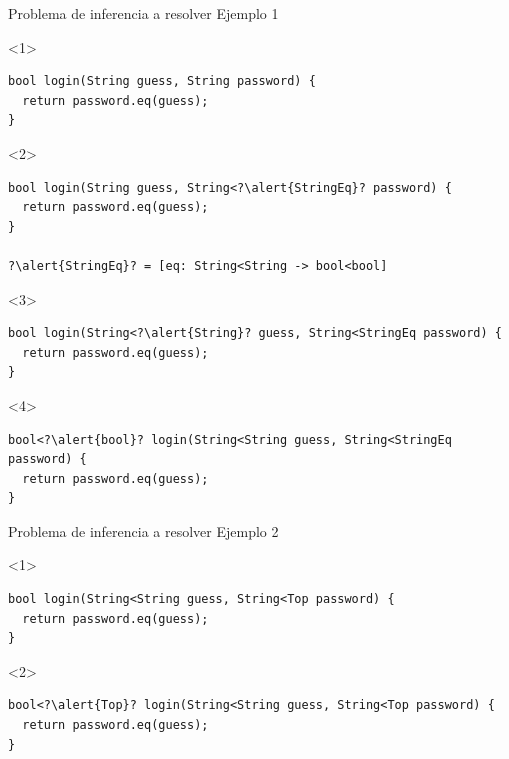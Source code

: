 \documentclass[aspectratio=169,10pt]{beamer}
\begin{document}
\begin{frame}[fragile]{Problema de inferencia a resolver}
	Ejemplo 1 \\
	\vspace{1cm}
	\begin{onlyenv}
\begin{lstlisting}[escapechar=?,basicstyle=\fontsize{9}{9}\ttfamily]
bool login(String guess, String password) {
  return password.eq(guess);
}
\end{lstlisting}
	\end{onlyenv}
	\begin{onlyenv}
\begin{lstlisting}[escapechar=?,basicstyle=\fontsize{9}{9}\ttfamily]
bool login(String guess, String<?\alert{StringEq}? password) {
  return password.eq(guess);
}

?\alert{StringEq}? = [eq: String<String -> bool<bool]
\end{lstlisting}
	\end{onlyenv}
\begin{onlyenv}<3>
\begin{lstlisting}[escapechar=?,basicstyle=\fontsize{9}{9}\ttfamily]
bool login(String<?\alert{String}? guess, String<StringEq password) {
  return password.eq(guess);
}
\end{lstlisting}
	\end{onlyenv}
	\begin{onlyenv}
\begin{lstlisting}[escapechar=?,basicstyle=\fontsize{9}{9}\ttfamily]
bool<?\alert{bool}? login(String<String guess, String<StringEq password) {
  return password.eq(guess);
}
\end{lstlisting}
	\end{onlyenv}
\end{frame}

\begin{frame}[fragile]{Problema de inferencia a resolver}
	Ejemplo 2 \\
	\vspace{1cm}
	\begin{onlyenv}
\begin{lstlisting}[basicstyle=\fontsize{9}{9}\ttfamily]
bool login(String<String guess, String<Top password) {
  return password.eq(guess);
}
\end{lstlisting}
	\end{onlyenv}
	\begin{onlyenv}
\begin{lstlisting}[escapechar=?,basicstyle=\fontsize{9}{9}\ttfamily]
bool<?\alert{Top}? login(String<String guess, String<Top password) {
  return password.eq(guess);
}
\end{lstlisting}
	\end{onlyenv}
\end{frame}
\end{document}
